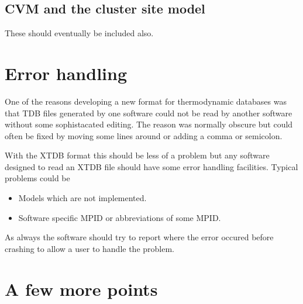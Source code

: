 \documentclass{article}
\begin{document}
\subsection{CVM and the cluster site model}

These should eventually be included also.

\section{Error handling}

One of the reasons developing a new format for thermodynamic databases
was that TDB files generated by one software could not be read by
another software without some sophistacated editing.  The reason was
normally obscure but could often be fixed by moving some lines around
or adding a comma or semicolon.

With the XTDB format this should be less of a problem but any software
designed to read an XTDB file should have some error handling
facilities.  Typical problems could be

\begin{itemize}
\item Models which are not implemented.
\item Software specific MPID or abbreviations of some MPID.
\end{itemize}

As always the software should try to report where the error occured
before crashing to allow a user to handle the problem.

\section{A few more points}\label{sec:points}
\end{document}
